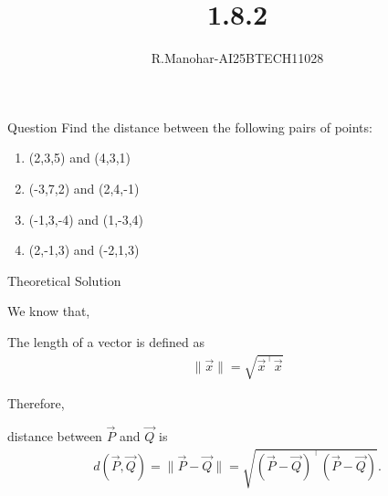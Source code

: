 \documentclass{beamer}
\title 
{1.8.2}
\author 
{R.Manohar-AI25BTECH11028}
\begin{document}
\frame{\titlepage}
\begin{frame}{Question}
Find the distance between the following pairs of points:
\begin{enumerate}
\item (2,3,5) and (4,3,1)
\item (-3,7,2) and (2,4,-1)
\item (-1,3,-4) and (1,-3,4)
\item (2,-1,3) and (-2,1,3)
\end{enumerate}
\end{frame}



\begin{frame}{Theoretical Solution}

We know that,

The length of a vector is defined as
\begin{align}
    \|\vec{x}\| = \sqrt{\vec{x}^\top \vec{x}}
\end{align}

Therefore,

 distance between $\vec{P}$ and $\vec{Q}$ is
\begin{align}
d(\vec{P},\vec{Q}) = \|\vec{P}-\vec{Q}\|
= \sqrt{(\vec{P}-\vec{Q})^\top(\vec{P}-\vec{Q})}.
\end{align}

\end{frame}
\end{document}
